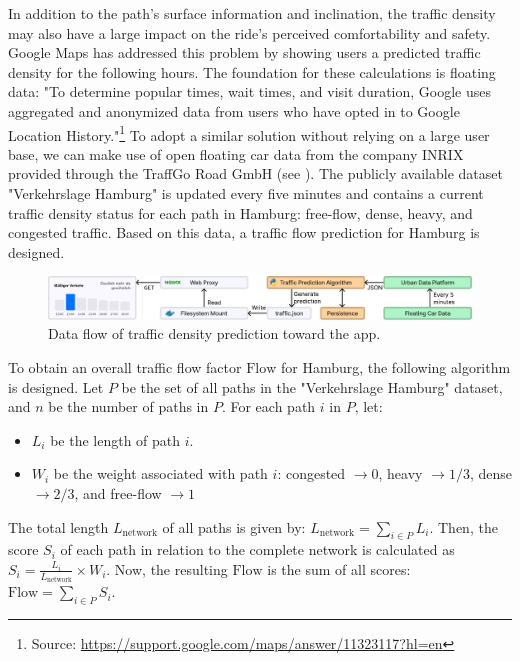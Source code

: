 In addition to the path's surface information and inclination, the traffic density may also have a large impact on the ride's perceived comfortability and safety. Google Maps has addressed this problem by showing users a predicted traffic density for the following hours. The foundation for these calculations is floating data: "To determine popular times, wait times, and visit duration, Google uses aggregated and anonymized data from users who have opted in to Google Location History."\footnote{Source: \url{https://support.google.com/maps/answer/11323117?hl=en}} To adopt a similar solution without relying on a large user base, we can make use of open floating car data from the company INRIX provided through the TraffGo Road GmbH (see ). The publicly available dataset "Verkehrslage Hamburg" is updated every five minutes and contains a current traffic density status for each path in Hamburg: free-flow, dense, heavy, and congested traffic. Based on this data, a traffic flow prediction for Hamburg is designed.

\begin{figure}[htbp]
\centering
\includegraphics[width=\linewidth]{images/traffic-density-prediction.pdf}
\caption{Data flow of traffic density prediction toward the app.}
\label{fig:traffic-density-prediction}
\end{figure}

To obtain an overall traffic flow factor $\text{Flow}$ for Hamburg, the following algorithm is designed. Let $P$ be the set of all paths in the "Verkehrslage Hamburg" dataset, and $n$ be the number of paths in $P$. For each path $i$ in $P$, let:

\begin{itemize}
    \item $L_i$ be the length of path $i$.
    \item $W_i$ be the weight associated with path $i$: congested $\rightarrow 0$, heavy $\rightarrow 1/3$, dense $\rightarrow 2/3$, and free-flow $\rightarrow 1$
\end{itemize}

The total length $L_\text{network}$ of all paths is given by: $L_\text{network} = \sum_{i \in P} L_i$. Then, the score $S_i$ of each path in relation to the complete network is calculated as $S_i = \frac{L_i}{L_\text{network}} \times W_i$. Now, the resulting $\text{Flow}$ is the sum of all scores: $\text{Flow} = \sum_{i \in P} S_i$. 


